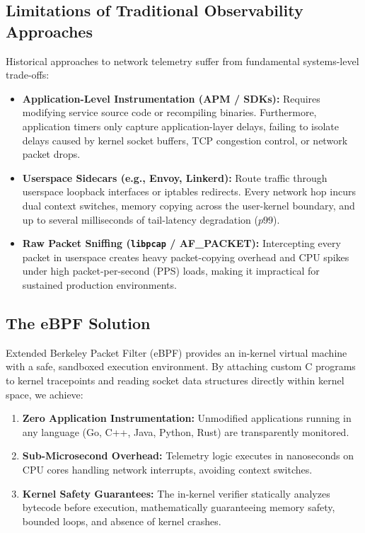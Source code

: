 \documentclass[11pt,a4paper]{article}
\begin{document}
\subsection{Limitations of Traditional Observability Approaches}
Historical approaches to network telemetry suffer from fundamental systems-level trade-offs:
\begin{itemize}
    \item \textbf{Application-Level Instrumentation (APM / SDKs):} Requires modifying service source code or recompiling binaries. Furthermore, application timers only capture application-layer delays, failing to isolate delays caused by kernel socket buffers, TCP congestion control, or network packet drops.
    \item \textbf{Userspace Sidecars (e.g., Envoy, Linkerd):} Route traffic through userspace loopback interfaces or iptables redirects. Every network hop incurs dual context switches, memory copying across the user-kernel boundary, and up to several milliseconds of tail-latency degradation ($p99$).
    \item \textbf{Raw Packet Sniffing (\texttt{libpcap} / AF\_PACKET):} Intercepting every packet in userspace creates heavy packet-copying overhead and CPU spikes under high packet-per-second (PPS) loads, making it impractical for sustained production environments.
\end{itemize}

\subsection{The eBPF Solution}
Extended Berkeley Packet Filter (eBPF) provides an in-kernel virtual machine with a safe, sandboxed execution environment. By attaching custom C programs to kernel tracepoints and reading socket data structures directly within kernel space, we achieve:
\begin{enumerate}
    \item \textbf{Zero Application Instrumentation:} Unmodified applications running in any language (Go, C++, Java, Python, Rust) are transparently monitored.
    \item \textbf{Sub-Microsecond Overhead:} Telemetry logic executes in nanoseconds on CPU cores handling network interrupts, avoiding context switches.
    \item \textbf{Kernel Safety Guarantees:} The in-kernel verifier statically analyzes bytecode before execution, mathematically guaranteeing memory safety, bounded loops, and absence of kernel crashes.
\end{enumerate}
\end{document}
